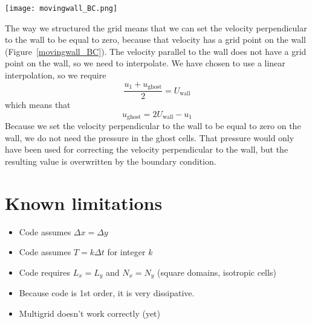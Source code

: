 \documentclass[12pt]{article}
\begin{document}
\begin{center}
\begin{figure*}
\center
\texttt{[image: movingwall\_BC.png]} 
\caption{Schematic of moving wall boundary condition interpolation.}
\label{movingwall_BC}
\end{figure*}
\end{center}

The way we structured the grid means that we can set the velocity perpendicular to the wall to be equal to zero, because that velocity has a grid point on the wall (Figure~\ref{movingwall_BC}).  The velocity parallel to the wall does not have a grid point on the wall, so we need to interpolate. We have chosen to use a linear interpolation, so we require
\[ \frac{u_1 + u_{\mathrm{ghost}}}{2} = U_{\mathrm{wall}}\]
which means that
\begin{equation}
u_{\mathrm{ghost}} = 2U_{\mathrm{wall}} - u_1
\end{equation}
Because we set the velocity perpendicular to the wall to be equal to zero on the wall, we do not need the pressure in the ghost cells.  That pressure would only have been used for correcting the velocity perpendicular to the wall, but the resulting value is overwritten by the boundary condition.

\section{Known limitations}
\begin{itemize}
\item Code assumes $\Delta x=\Delta y$
\item Code assumes $T = k\Delta t$ for integer $k$
\item Code requires $L_x = L_y$ and $N_x = N_y$ (square domains, isotropic cells)
\item Because code is 1st order, it is very dissipative.
\item Multigrid doesn't work correctly (yet)
\end{itemize}
\end{document}
